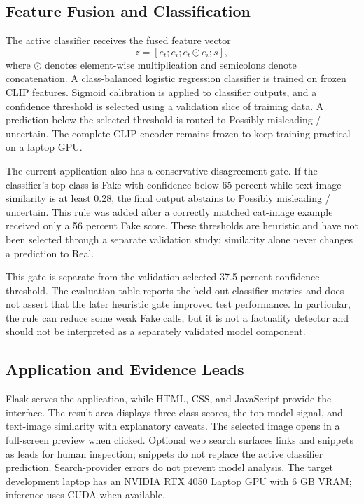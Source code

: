 \documentclass[conference]{IEEEtran}
\begin{document}
\subsection{Feature Fusion and Classification}
The active classifier receives the fused feature vector
\begin{equation}
z=[e_t; e_i; e_t\odot e_i; s],
\end{equation}
where $\odot$ denotes element-wise multiplication and semicolons denote concatenation. A class-balanced logistic regression classifier is trained on frozen CLIP features. Sigmoid calibration is applied to classifier outputs, and a confidence threshold is selected using a validation slice of training data. A prediction below the selected threshold is routed to Possibly misleading / uncertain. The complete CLIP encoder remains frozen to keep training practical on a laptop GPU.

The current application also has a conservative disagreement gate. If the classifier's top class is Fake with confidence below 65 percent while text-image similarity is at least 0.28, the final output abstains to Possibly misleading / uncertain. This rule was added after a correctly matched cat-image example received only a 56 percent Fake score. These thresholds are heuristic and have not been selected through a separate validation study; similarity alone never changes a prediction to Real.

This gate is separate from the validation-selected 37.5 percent confidence threshold. The evaluation table reports the held-out classifier metrics and does not assert that the later heuristic gate improved test performance. In particular, the rule can reduce some weak Fake calls, but it is not a factuality detector and should not be interpreted as a separately validated model component.

\subsection{Application and Evidence Leads}
Flask serves the application, while HTML, CSS, and JavaScript provide the interface. The result area displays three class scores, the top model signal, and text-image similarity with explanatory caveats. The selected image opens in a full-screen preview when clicked. Optional web search surfaces links and snippets as leads for human inspection; snippets do not replace the active classifier prediction. Search-provider errors do not prevent model analysis. The target development laptop has an NVIDIA RTX 4050 Laptop GPU with 6 GB VRAM; inference uses CUDA when available.
\end{document}
